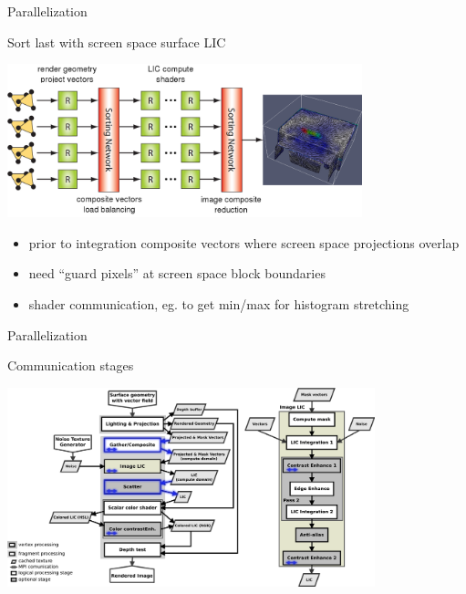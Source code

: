 \documentclass[notes]{beamer}
\begin{document}
\begin{frame}{Parallelization}
  \begin{beamerboxesrounded}{Sort last with screen space surface LIC}
      \begin{center}
      \includegraphics[height=1.75in]{render-sorting-plus-lic.png}
      \end{center}
      \vspace{-0.15in}
      \begin{itemize}
      \item prior to integration composite vectors where screen space projections overlap
      \item need ``guard pixels'' at screen space block boundaries
      \item shader communication, eg. to get min/max for histogram stretching
      \end{itemize} 
  \end{beamerboxesrounded}
\end{frame}

\begin{frame}{Parallelization}
  \begin{beamerboxesrounded}{Communication stages}
  \begin{center}
    \includegraphics[width=4.2in]{ce-flow-par.png}
  \end{center}
  \end{beamerboxesrounded}
  \end{frame}
\end{document}
